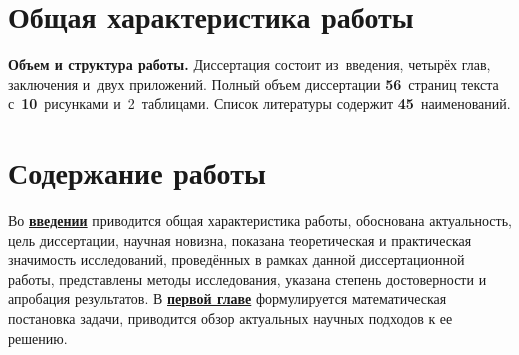 \section*{Общая характеристика работы}

\newcommand{\actuality}{\textbf{\actualityTXT}}
\newcommand{\progress}{\textbf{\progressTXT}}
\newcommand{\actualityandprogress}{\textbf{\actualityandprogressTXT}}
\newcommand{\aim}{{\textbf\aimTXT}}
\newcommand{\tasks}{\textbf{\tasksTXT}}
\newcommand{\novelty}{\textbf{\noveltyTXT}}
\newcommand{\influence}{\textbf{\influenceTXT}}
\newcommand{\methods}{\textbf{\methodsTXT}}
\newcommand{\defpositions}{\textbf{\defpositionsTXT}}
\newcommand{\reliability}{\textbf{\reliabilityTXT}}
\newcommand{\probation}{\textbf{\probationTXT}}
\newcommand{\contribution}{\textbf{\contributionTXT}}
\newcommand{\publications}{\textbf{\publicationsTXT}}






\textbf{Объем и структура работы.} Диссертация состоит из~введения, четырёх глав, заключения и~двух приложений.
Полный объем диссертации \textbf{56}~страниц текста с~\textbf{10}~рисунками и~2~таблицами. Список литературы содержит \textbf{45}~наименований.

\section*{Содержание работы}
Во \underline{\textbf{введении}} приводится общая характеристика работы, 
обоснована актуальность, цель диссертации, научная новизна, показана теоретическая и практическая значимость исследований, проведённых в рамках данной диссертационной работы, представлены методы исследования, указана степень достоверности и апробация результатов.
\vspace{5mm}
В \underline{\textbf{первой главе}} формулируется математическая постановка задачи, приводится обзор актуальных научных подходов к ее решению.

